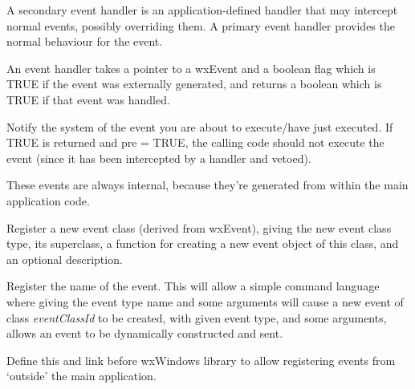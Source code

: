 A secondary event handler is an application-defined handler that may
intercept normal events, possibly overriding them. A primary event handler
provides the normal behaviour for the event.

An event handler takes a pointer to a wxEvent and a boolean flag which is
TRUE if the event was externally generated, and returns a boolean which is
TRUE if that event was handled.



Notify the system of the event you are about to execute/have just
executed.  If TRUE is returned and pre = TRUE, the calling code should
not execute the event (since it has been intercepted by a handler and
vetoed).

These events are always internal, because they're generated from within
the main application code.



Register a new event class (derived from wxEvent), giving the new
event class type, its superclass, a function for creating a new event
object of this class, and an optional description.



Register the name of the event. This will allow a simple command
language where giving the event type name and some arguments will
cause a new event of class {\it eventClassId} to be created, with given
event type, and some arguments, allows an event to be dynamically
constructed and sent.



Define this and link before wxWindows library to allow registering
events from `outside' the main application.



